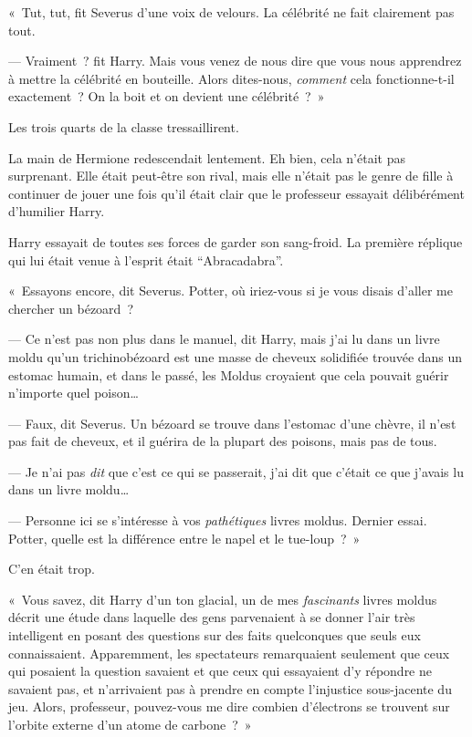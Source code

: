 «~Tut, tut, fit Severus d'une voix de velours.
La célébrité ne fait clairement pas tout.

--- Vraiment~? fit Harry.
Mais vous venez de nous dire que vous nous apprendrez à mettre la célébrité en bouteille.
Alors dites-nous, \emph{comment} cela fonctionne-t-il exactement~?
On la boit et on devient une célébrité~?~»

Les trois quarts de la classe tressaillirent.

La main de Hermione redescendait lentement.
Eh bien, cela n'était pas surprenant.
Elle était peut-être son rival, mais elle n'était pas le genre de fille à continuer de jouer une fois qu'il était clair que le professeur essayait délibérément d'humilier Harry.

Harry essayait de toutes ses forces de garder son sang-froid.
La première réplique qui lui était venue à l'esprit était “Abracadabra”.

«~Essayons encore, dit Severus.
Potter, où iriez-vous si je vous disais d'aller me chercher un bézoard~?

--- Ce n'est pas non plus dans le manuel, dit Harry, mais j'ai lu dans un livre moldu qu'un trichinobézoard est une masse de cheveux solidifiée trouvée dans un estomac humain, et dans le passé, les Moldus croyaient que cela pouvait guérir n'importe quel poison…

--- Faux, dit Severus.
Un bézoard se trouve dans l'estomac d'une chèvre, il n'est pas fait de cheveux, et il guérira de la plupart des poisons, mais pas de tous.

--- Je n'ai pas \emph{dit} que c'est ce qui se passerait, j'ai dit que c'était ce que j'avais lu dans un livre moldu…

--- Personne ici se s'intéresse à vos \emph{pathétiques} livres moldus.
Dernier essai.
Potter, quelle est la différence entre le napel et le tue-loup~?~»

C'en était trop.

«~Vous savez, dit Harry d'un ton glacial, un de mes \emph{fascinants} livres moldus décrit une étude dans laquelle des gens parvenaient à se donner l'air très intelligent en posant des questions sur des faits quelconques que seuls eux connaissaient.
Apparemment, les spectateurs remarquaient seulement que ceux qui posaient la question savaient et que ceux qui essayaient d'y répondre ne savaient pas, et n'arrivaient pas à prendre en compte l'injustice sous-jacente du jeu.
Alors, professeur, pouvez-vous me dire combien d'électrons se trouvent sur l'orbite externe d'un atome de carbone~?~»

